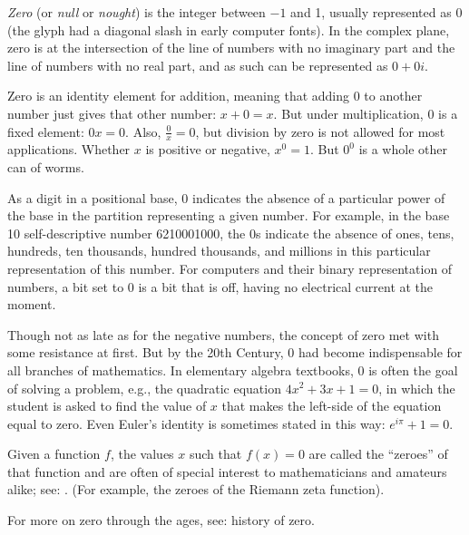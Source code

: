 \documentclass[12pt]{article}
\begin{document}
\emph{Zero} (or \emph{null} or \emph{nought}) is the integer between $-1$ and 1, usually represented as 0 (the glyph had a diagonal slash in early computer fonts). In the complex plane, zero is at the intersection of the line of numbers with no imaginary part and the line of numbers with no real part, and as such can be represented as $0 + 0i$.

Zero is an identity element for addition, meaning that adding 0 to another number just gives that other number: $x + 0 = x$. But under multiplication, 0 is a fixed element: $0x = 0$. Also, $\frac{0}{x} = 0$, but division by zero is not allowed for most applications. Whether $x$ is positive or negative, $x^0 = 1$. But $0^0$ is a whole other can of worms.

As a digit in a positional base, 0 indicates the absence of a particular power of the base in the partition representing a given number. For example, in the base 10 self-descriptive number 6210001000, the 0s indicate the absence of ones, tens, hundreds, ten thousands, hundred thousands, and millions in this particular representation of this number. For computers and their binary representation of numbers, a bit set to 0 is a bit that is off, having no electrical current at the moment.

Though not as late as for the negative numbers, the concept of zero met with some resistance at first. But by the 20th Century, 0 had become indispensable for all branches of mathematics. In elementary algebra textbooks, 0 is often the goal of solving a problem, e.g., the quadratic equation $4x^2 + 3x + 1 = 0$, in which the student is asked to find the value of $x$ that makes the left-side of the equation equal to zero. Even Euler's identity is sometimes stated in this way: $e^{i \pi} + 1 = 0$.

Given a function $f$, the values $x$ such that $f(x) = 0$ are called the ``zeroes'' of that function and are often of special interest to mathematicians and amateurs alike; see: . (For example, the zeroes of the Riemann zeta function).

For more on zero through the ages, see: history of zero.
\end{document}
